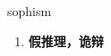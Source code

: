
\begin{frame}
{\huge sophism}
\begin{center}
\begin{enumerate}\Large
  \item \textbf{假推理，诡辩}
\end{enumerate}
\end{center}
\end{frame}
